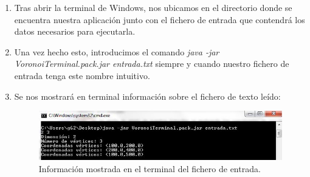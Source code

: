     \begin{enumerate}
        \item Tras abrir la terminal de Windows, nos ubicamos en el directorio donde se encuentra nuestra aplicación junto con el fichero de entrada que contendrá los datos necesarios para ejecutarla.
        \item Una vez hecho esto, introducimos el comando 
        \textit{java -jar VoronoiTerminal.pack.jar entrada.txt}
        siempre y cuando nuestro fichero de entrada tenga este nombre intuitivo. 
        \item Se nos mostrará en terminal información sobre el fichero de texto leído:        
            \begin{figure} [H]        
                \centering \includegraphics[scale=0.8]{imagenes/terminal1.JPG}
               \caption{Información mostrada en el terminal del fichero de entrada.}
            \end{figure}
        

\end{enumerate}

